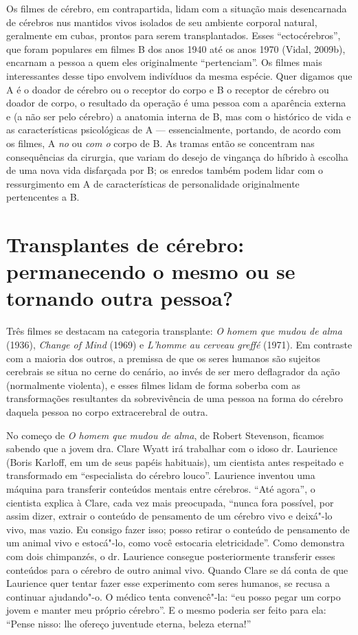 Os filmes de cérebro, em contrapartida, lidam com a situação mais
desencarnada de cérebros nus mantidos vivos isolados de seu ambiente
corporal natural, geralmente em cubas, prontos para serem
transplantados. Esses ``ectocérebros'', que foram populares em filmes B
dos anos 1940 até os anos 1970 (Vidal, 2009b), encarnam a pessoa a quem
eles originalmente ``pertenciam''. Os filmes mais interessantes desse
tipo envolvem indivíduos da mesma espécie. Quer digamos que A é o doador
de cérebro ou o receptor do corpo e B o receptor de cérebro ou doador de
corpo, o resultado da operação é uma pessoa com a aparência externa e (a
não ser pelo cérebro) a anatomia interna de B, mas com o histórico de
vida e as características psicológicas de A --- essencialmente,
portando, de acordo com os filmes, A \emph{no} ou \emph{com o} corpo de
B. As tramas então se concentram nas consequências da cirurgia, que
variam do desejo de vingança do híbrido à escolha de uma nova vida
disfarçada por B; os enredos também podem lidar com o ressurgimento em A
de características de personalidade originalmente pertencentes a B.

\chapter{Transplantes de cérebro: permanecendo o mesmo ou se tornando outra
pessoa?}

Três filmes se destacam na categoria transplante: \emph{O homem que
mudou de alma} (1936), \emph{Change of Mind} (1969) e \emph{L'homme au
cerveau greffé} (1971). Em contraste com a maioria dos outros, a
premissa de que os seres humanos são sujeitos cerebrais se situa no
cerne do cenário, ao invés de ser mero deflagrador da ação (normalmente
violenta), e esses filmes lidam de forma soberba com as transformações
resultantes da sobrevivência de uma pessoa na forma do cérebro daquela
pessoa no corpo extracerebral de outra.

No começo de \emph{O homem que mudou de alma}, de Robert Stevenson,
ficamos sabendo que a jovem dra. Clare Wyatt irá trabalhar com o idoso
dr. Laurience (Boris Karloff, em um de seus papéis habituais), um
cientista antes respeitado e transformado em ``especialista do cérebro
louco''. Laurience inventou uma máquina para transferir conteúdos
mentais entre cérebros. ``Até agora'', o cientista explica à Clare, cada
vez mais preocupada, ``nunca fora possível, por assim dizer, extrair o
conteúdo de pensamento de um cérebro vivo e deixá"-lo vivo, mas vazio. Eu
consigo fazer isso; posso retirar o conteúdo de pensamento de um animal
vivo e estocá"-lo, como você estocaria eletricidade''. Como demonstra com
dois chimpanzés, o dr. Laurience consegue posteriormente transferir
esses conteúdos para o cérebro de outro animal vivo. Quando Clare se dá
conta de que Laurience quer tentar fazer esse experimento com seres
humanos, se recusa a continuar ajudando"-o. O médico tenta convencê"-la:
``eu posso pegar um corpo jovem e manter meu próprio cérebro''. E o
mesmo poderia ser feito para ela: ``Pense nisso: lhe ofereço juventude
eterna, beleza eterna!''

